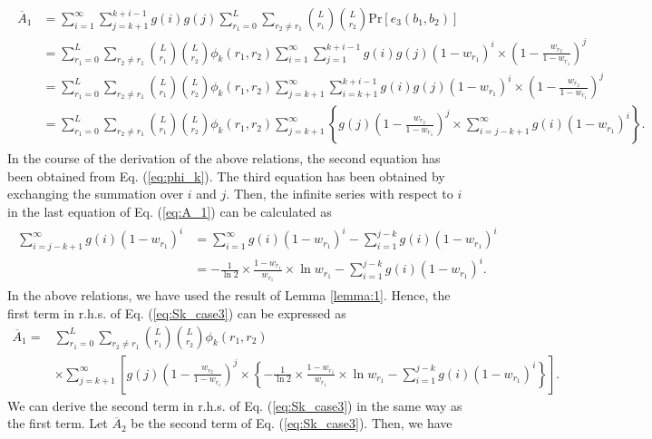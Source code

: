 \documentclass[dvipdfmx,english]{ampmt} %
\begin{document}
\begin{align}\begin{split}\label{eq:A_1}
	\overline{A}_1
	&=\sum_{i=1}^{\infty}\sum_{j=k+1}^{k+i-1} g(i)g(j) \sum_{r_1=0}^{L} \sum_{r_2 \neq r_1} \binom{L}{r_1}\binom{L}{r_2}\mathrm{Pr}[e_3(b_1,b_2)] \\
	&=\sum_{r_1=0}^{L} \sum_{r_2 \neq r_1} \binom{L}{r_1}\binom{L}{r_2}\phi_k(r_1,r_2)
	\sum_{i=1}^{\infty} \sum_{j=1}^{k+i-1} g(i)g(j)(1-w_{r_1})^{i} \times \left(1-\frac{w_{r_2}}{1-w_{r_1}} \right)^{j} \\
	&=\sum_{r_1=0}^{L} \sum_{r_2 \neq r_1} \binom{L}{r_1}\binom{L}{r_2}\phi_k(r_1,r_2)
	\sum_{j=k+1}^{\infty} \sum_{i=k+1}^{k+i-1} g(i)g(j)(1-w_{r_1})^{i} \times \left(1-\frac{w_{r_2}}{1-w_{r_1}} \right)^{j} \\
	&=\sum_{r_1=0}^{L} \sum_{r_2 \neq r_1} \binom{L}{r_1}\binom{L}{r_2}\phi_k(r_1,r_2)
	\sum_{j=k+1}^{\infty} \left\{ g(j) \left(1-\frac{w_{r_2}}{1-w_{r_1}} \right)^{j} \times \sum_{i=j-k+1}^{\infty} g(i)(1-w_{r_1})^{i} \right\}.
\end{split}\end{align}
In the course of the derivation of the above relations, the second equation has been obtained from Eq. (\ref{eq:phi_k}). The third equation has been obtained by exchanging the summation over $i$ and $j$.
%
Then, the infinite series with respect to $i$ in the last equation of Eq. (\ref{eq:A_1}) can be calculated as
\begin{align}\begin{split}
	\sum_{i=j-k+1}^{\infty} g(i)(1-w_{r_1})^{i} 
	&= \sum_{i=1}^{\infty} g(i)(1-w_{r_1})^{i} - \sum_{i=1}^{j-k} g(i)(1-w_{r_1})^{i} \\
	&= -\frac{1}{\ln 2} \times \frac{1-w_{r_1}}{w_{r_1}} \times \ln w_{r_1} - \sum_{i=1}^{j-k} g(i)(1-w_{r_1})^{i}.
\end{split}\end{align}
In the above relations, we have used the result of Lemma \ref{lemma:1}.
Hence, the first term in r.h.s. of Eq. (\ref{eq:Sk_case3}) can be expressed as
\begin{align}
	\overline{A}_1 
	=& \sum_{r_1=0}^{L} \sum_{r_2 \neq r_1} \binom{L}{r_1}\binom{L}{r_2}\phi_k(r_1,r_2)\\
	&\times\sum_{j=k+1}^{\infty} \left[ g(j) \left(1-\frac{w_{r_2}}{1-w_{r_1}} \right)^{j} \times \left\{ -\frac{1}{\ln 2} \times \frac{1-w_{r_1}}{w_{r_1}} \times \ln w_{r_1} - \sum_{i=1}^{j-k} g(i)(1-w_{r_1})^{i} \right\} \right].
\end{align}
We can derive the second term in r.h.s. of Eq. (\ref{eq:Sk_case3}) in the same way as the first term. Let $\overline{A}_2$ be the second term of Eq. (\ref{eq:Sk_case3}). Then, we have
\end{document}

